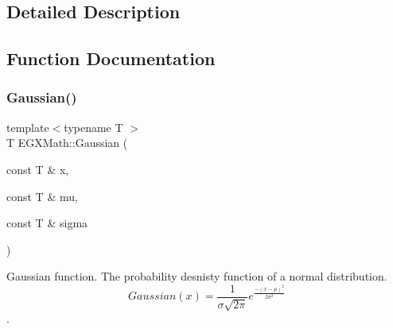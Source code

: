 \subsection{Detailed Description}


\subsection{Function Documentation}
\mbox{\label{group___e_g_x_math-_functions-_gaussian_ga647b46315081e299edc16a1c7f4e4032}} 
\subsubsection{\texorpdfstring{Gaussian()}{Gaussian()}}
{\footnotesize\ttfamily template$<$typename T $>$ \\
T E\+G\+X\+Math\+::\+Gaussian (\begin{DoxyParamCaption}\item[{const T \&}]{x,  }\item[{const T \&}]{mu,  }\item[{const T \&}]{sigma }\end{DoxyParamCaption})}



Gaussian function. The probability desnisty function of a normal distribution. \[ Gaussian(x)=\frac{1}{\sigma \sqrt{2\pi}}e^{\frac{-(x-\mu)^2}{2\sigma^2}} \]. 

